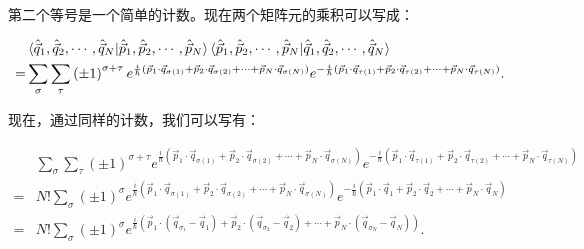 第二个等号是一个简单的计数。现在两个矩阵元的乘积可以写成：
\begin{linenomath}\begin{equation}
    \begin{aligned}
            &\braket{\hat{\vec{q}}_1,\hat{\vec{q}}_2,\cdots, \hat{\vec{q}}_N|\hat{\vec{p}}_1,\hat{\vec{p}}_2,\cdots, \hat{\vec{p}}_N} \braket{\hat{\vec{p}}_1,\hat{\vec{p}}_2,\cdots, \hat{\vec{p}}_N|\hat{\vec{q}}_1,\hat{\vec{q}}_2,\cdots, \hat{\vec{q}}_N} 
    \\ =& \sum_{\sigma}\sum_{\tau}\left( \pm 1 \right)^{\sigma+\tau} e^{\frac{i}{\hbar}(\vec{p}_1\cdot\vec{q}_{\sigma(1)} + \vec{p}_2\cdot\vec{q}_{\sigma(2)} + \cdots + \vec{p}_N\cdot\vec{q}_{\sigma(N)})} e^{-\frac{i}{\hbar}(\vec{p}_1\cdot\vec{q}_{\tau(1)} + \vec{p}_2\cdot\vec{q}_{\tau(2)} + \cdots + \vec{p}_N\cdot\vec{q}_{\tau(N)})}.
    \end{aligned}
\end{equation}\end{linenomath}
现在，通过同样的计数，我们可以写有：
\begin{linenomath}\begin{equation}
    \begin{aligned}
            &\sum_{\sigma}\sum_{\tau}\left( \pm 1 \right)^{\sigma+\tau} e^{\frac{i}{\hbar}(\vec{p}_1\cdot\vec{q}_{\sigma(1)} + \vec{p}_2\cdot\vec{q}_{\sigma(2)} + \cdots + \vec{p}_N\cdot\vec{q}_{\sigma(N)})} e^{-\frac{i}{\hbar}(\vec{p}_1\cdot\vec{q}_{\tau(1)} + \vec{p}_2\cdot\vec{q}_{\tau(2)} + \cdots + \vec{p}_N\cdot\vec{q}_{\tau(N)})} 
    \\ =& N! \sum_{\sigma}\left( \pm 1 \right)^{\sigma} e^{\frac{i}{\hbar}(\vec{p}_1\cdot\vec{q}_{\sigma(1)} + \vec{p}_2\cdot\vec{q}_{\sigma(2)} + \cdots + \vec{p}_N\cdot\vec{q}_{\sigma(N)})} e^{-\frac{i}{\hbar}(\vec{p}_1\cdot\vec{q}_{1} + \vec{p}_2\cdot\vec{q}_{2} + \cdots + \vec{p}_N\cdot\vec{q}_{N})}
    \\ =& N! \sum_{\sigma}\left( \pm 1 \right)^{\sigma} e^{\frac{i}{\hbar}(\vec{p}_1\cdot\left( \vec{q}_{\sigma_1}-\vec{q}_1 \right) + \vec{p}_2\cdot\left( \vec{q}_{\sigma_2}-\vec{q}_2 \right) + \cdots + \vec{p}_N\cdot\left( \vec{q}_{\sigma_N}-\vec{q}_N \right))}.
    \end{aligned}
\end{equation}\end{linenomath}

